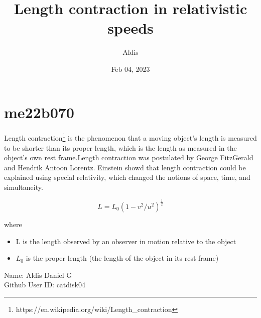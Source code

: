 \documentclass[12pt, a4paper]{article}
\author{Aldis}
\title{Length contraction in relativistic speeds}
\date{Feb 04, 2023}
\begin{document}
\maketitle
\section{me22b070}

Length contraction\footnote{https://en.wikipedia.org/wiki/Length\_contraction}
is the phenomenon that a moving object's length is measured to be shorter than its proper length, which is the length as measured in the object's own rest frame.Length contraction was postulated by George FitzGerald and Hendrik Antoon Lorentz. Einstein showd that length contraction could be explained using special relativity, which changed the notions of space, time, and simultaneity.

\begin{equation}
	L=L_0(1-v^2/u^2)^\frac{1}{2}
\end{equation}

where 
\begin{itemize}
	\item L is the length observed by an observer in motion relative to the object
	\item $L_0$ is the proper length (the length of the object in its rest frame)
\end{itemize}

\begin{flushleft}
Name: Aldis Daniel G\\
Github User ID: catdisk04
\end{flushleft}
\end{document}
